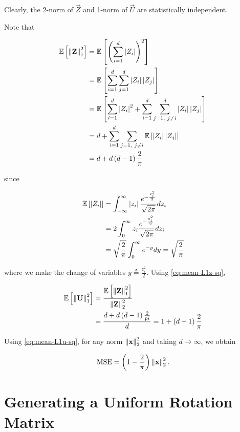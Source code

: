 \documentclass[twoside]{article}
\begin{document}
Clearly, the 2-norm of \(\vec{Z}\) and 1-norm of \(\vec{U}\) are statistically 
independent.

Note that

\begin{align}
    \mathbb{E}\left[ \left\lVert\boldsymbol{\mathbf{Z}}\right\rVert_1^2 \right] &= \mathbb{E}\left[ \left(\sum_{i=1}^d\left\vert Z_i\right\vert\right)^2 \right] \\
                              &= \mathbb{E}\left[ \sum_{i=1}^d\sum_{j=1}^d\left\vert Z_i\right\vert\left\vert Z_j\right\vert \right] \\
                              &= \mathbb{E}\left[ \sum_{i=1}^d\left\vert Z_i\right\vert^2 + \sum_{i=1}^d\sum_{j=1,\ j\neq i}^d\left\vert Z_i\right\vert\left\vert Z_j\right\vert \right] \\
                              &= d + \sum_{i=1}^d\sum_{j=1,\ j\neq i}\mathbb{E}\left[ \left\vert Z_i\right\vert\left\vert Z_j\right\vert \right] \\
                              &= d + d\left(d-1\right)\frac{2}{\pi}
                              \label{eq:mean-L1z-sq}
\end{align}

since

\begin{align}
    \mathbb{E}\left[ \left\vert Z_i\right\vert \right] &= \int_{-\infty}^{\infty}\left\vert z_i\right\vert\frac{e^{-\frac{z_i^2}{2}}}{\sqrt{2\pi}} dz_i \\
                     &= 2\int_{0}^{\infty} z_i \frac{e^{-\frac{z_i^2}{2}}}{\sqrt{2\pi}}dz_i \\
                     &= \sqrt{\frac{2}{\pi}}\int_0^{\infty}e^{-y}dy = \sqrt{\frac{2}{\pi}}
                     \label{eq:mean-absz}
\end{align}

where we make the change of variables \(y \triangleq \frac{z_i^2}{2}\). Using
\eqref{eq:mean-L1z-sq},

\begin{align}
    \mathbb{E}\left[ \left\lVert\boldsymbol{\mathbf{U}}\right\rVert_1^2 \right] &= \frac{\mathbb{E}\left[ \left\lVert\boldsymbol{\mathbf{Z}}\right\rVert_1^2 \right]}{\left\lVert\boldsymbol{\mathbf{Z}}\right\rVert_2^2} \\
                              &= \frac{d + d\left(d-1\right)\frac{2}{pi}}{d} = 1 + \left(d-1\right)\frac{2}{\pi}
                              \label{eq:mean-L1u-sq}
\end{align}

Using \eqref{eq:mean-L1u-sq}, for any norm \(\left\lVert\boldsymbol{\mathbf{x}}\right\rVert_2^2\) and taking \(d \to \infty\), we obtain

\begin{equation}
    \mathrm{MSE} = \left(1-\frac{2}{\pi}\right)\left\lVert\boldsymbol{\mathbf{x}}\right\rVert_2^2.
    \label{eq:mse-drive}
\end{equation}

\section{Generating a Uniform Rotation Matrix}
\end{document}
